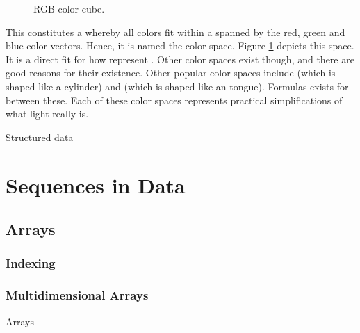 \begin{figure}[tbp]
  
  \caption{RGB color cube.}
  \label{fig:primdata:struct:color}
\end{figure}

This constitutes a  whereby all colors fit within a  spanned by the red, green and blue color vectors. Hence, it is named the  color space. Figure \ref{fig:primdata:struct:color} depicts this space. It is a direct fit for how  represent . Other color spaces exist though, and there are good reasons for their existence. Other popular color spaces include  (which is shaped like a cylinder) and  (which is shaped like an tongue). Formulas exists for  between these. Each of these color spaces represents practical simplifications of what light really is.

\csharpsubsection{\csharp}


\begin{syntaxfloat}
  
  \caption{Structured data}
  \label{syntax:data:struct}
\end{syntaxfloat}

\section{Sequences in Data}

\subsection{Arrays}

\subsubsection{Indexing}


\subsubsection{Multidimensional Arrays}

\csharpsubsubsection{\csharp}

\begin{syntaxfloat}
  
  \caption{Arrays}
  \label{syntax:data:array}
\end{syntaxfloat}

